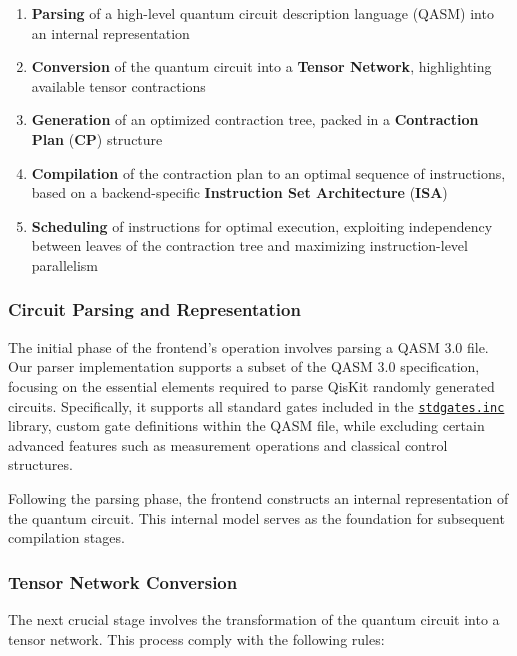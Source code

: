 \documentclass[12pt,oneside,a4paper]{article}
\begin{document}
\begin{enumerate}
    \item \textbf{Parsing} of a high-level quantum circuit description language (QASM) into an internal representation
    \item \textbf{Conversion} of the quantum circuit into a \textbf{Tensor Network}, highlighting available tensor contractions
    \item \textbf{Generation} of an optimized contraction tree, packed in a \textbf{Contraction Plan} (\textbf{CP}) structure
    \item \textbf{Compilation} of the contraction plan to an optimal sequence of instructions, based on a backend-specific \textbf{Instruction Set Architecture} (\textbf{ISA})
    \item \textbf{Scheduling} of instructions for optimal execution, exploiting independency between leaves of the contraction tree and maximizing instruction-level parallelism
\end{enumerate}

\subsubsection{Circuit Parsing and Representation}

The initial phase of the frontend's operation involves parsing a QASM 3.0\cite{cross2017openquantumassemblylanguage} file. Our parser implementation supports a subset of the QASM 3.0 specification, focusing on the essential elements required to parse QisKit\cite{qiskit2024} randomly generated circuits. Specifically, it supports all standard gates included in the \href{https://github.com/Qiskit/qiskit/blob/main/qiskit/qasm/libs/stdgates.inc}{\texttt{stdgates.inc}} library, custom gate definitions within the QASM file, while excluding certain advanced features such as measurement operations and classical control structures.

Following the parsing phase, the frontend constructs an internal representation of the quantum circuit. This internal model serves as the foundation for subsequent compilation stages.

\subsubsection{Tensor Network Conversion}

The next crucial stage involves the transformation of the quantum circuit into a tensor network. This process comply with the following rules:
\end{document}
